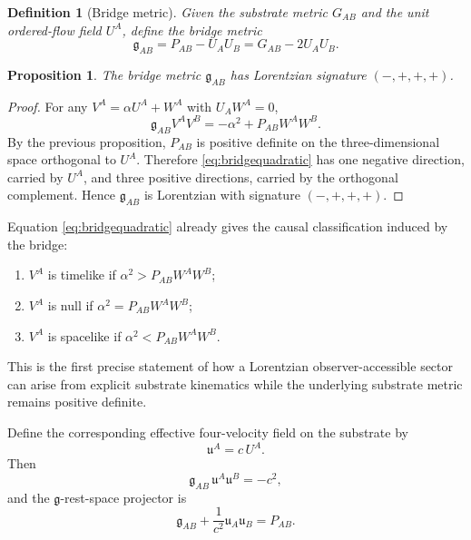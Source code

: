 \documentclass[11pt]{article}
\newcommand{\BridgeMetric}{\mathfrak{g}}
\newtheorem{definition}{Definition}
\newtheorem{proposition}{Proposition}
\begin{document}
\begin{definition}[Bridge metric]
Given the substrate metric \(G_{AB}\) and the unit ordered-flow field \(U^A\), define the bridge metric
\begin{equation}
\BridgeMetric_{AB}
=
P_{AB} - U_A U_B
=
G_{AB} - 2 U_A U_B.
\label{eq:bridgemetric}
\end{equation}
\end{definition}

\begin{proposition}
The bridge metric \(\BridgeMetric_{AB}\) has Lorentzian signature \((-,+,+,+)\).
\end{proposition}

\begin{proof}
For any \(V^A = \alpha U^A + W^A\) with \(U_AW^A=0\),
\begin{equation}
\BridgeMetric_{AB} V^A V^B
=
-\alpha^2 + P_{AB} W^A W^B.
\label{eq:bridgequadratic}
\end{equation}
By the previous proposition, \(P_{AB}\) is positive definite on the three-dimensional space orthogonal to \(U^A\). Therefore \eqref{eq:bridgequadratic} has one negative direction, carried by \(U^A\), and three positive directions, carried by the orthogonal complement. Hence \(\BridgeMetric_{AB}\) is Lorentzian with signature \((-,+,+,+)\).
\end{proof}

Equation \eqref{eq:bridgequadratic} already gives the causal classification induced by the bridge:
\begin{enumerate}
    \item \(V^A\) is timelike if \(\alpha^2 > P_{AB}W^A W^B\);
    \item \(V^A\) is null if \(\alpha^2 = P_{AB}W^A W^B\);
    \item \(V^A\) is spacelike if \(\alpha^2 < P_{AB}W^A W^B\).
\end{enumerate}
This is the first precise statement of how a Lorentzian observer-accessible sector can arise from explicit substrate kinematics while the underlying substrate metric remains positive definite.

Define the corresponding effective four-velocity field on the substrate by
\begin{equation}
\mathfrak u^A = c\, U^A.
\label{eq:substratefourvelocity}
\end{equation}
Then
\begin{equation}
\BridgeMetric_{AB}\,\mathfrak u^A \mathfrak u^B = -c^2,
\label{eq:bridgenorm}
\end{equation}
and the \(\BridgeMetric\)-rest-space projector is
\begin{equation}
\BridgeMetric_{AB}
+
\frac{1}{c^2}\mathfrak u_A \mathfrak u_B
=
P_{AB}.
\label{eq:bridgeprojector}
\end{equation}
\end{document}
